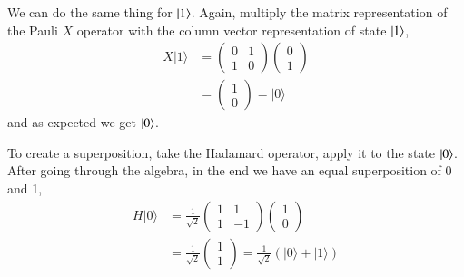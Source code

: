 
We can do the same thing for $\left| 1 \right\rangle$. Again, multiply the matrix representation of the Pauli $X$ operator with the column vector representation of state $\left| 1 \right\rangle$,
\begin{equation}
\begin{aligned}
X|1\rangle &=\left(\begin{array}{ll}
0 & 1 \\
1 & 0
\end{array}\right)\left(\begin{array}{l}
0 \\
1
\end{array}\right) \\
&=\left(\begin{array}{l}
1 \\
0
\end{array}\right)=|0\rangle
\end{aligned}
\end{equation}
and as expected we get $\left| 0 \right\rangle$. 

To create a superposition, take the Hadamard operator, apply it to the state $\left| 0 \right\rangle$. After going through the algebra, in the end we have an equal superposition of 0 and 1,
\begin{equation}
\begin{aligned}
H|0\rangle &=\frac{1}{\sqrt{2}}\left(\begin{array}{cc}
1 & 1 \\
1 & -1
\end{array}\right)\left(\begin{array}{l}
1 \\
0
\end{array}\right) \\
&=\frac{1}{\sqrt{2}}\left(\begin{array}{l}
1 \\
1
\end{array}\right)=\frac{1}{\sqrt{2}}(|0\rangle+|1\rangle)
\end{aligned}
\end{equation}

